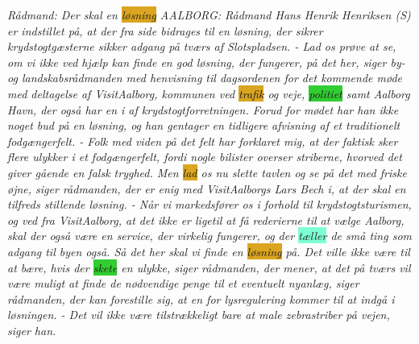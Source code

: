 \emph{
Rådmand: Der skal   en \colorbox{Goldenrod}{løsning} AALBORG: Rådmand Hans Henrik Henriksen (S) er indstillet på, at der fra  side bidrages til en løsning, der sikrer krydstogtgæsterne sikker adgang på tværs af Slotspladsen. - Lad os prøve at se, om vi ikke ved  \colorbox{Peach}{hjælp} kan \colorbox{Peach}{finde} en god løsning, der fungerer, på det her, siger by- og landskabsrådmanden med henvisning til dagsordenen for det \colorbox{Peach}{kommende} \colorbox{Peach}{møde} med deltagelse af VisitAalborg, \colorbox{Peach}{kommunen} ved \colorbox{Goldenrod}{trafik} og veje, \colorbox{LimeGreen}{politiet} \colorbox{Peach}{samt} Aalborg Havn, der også har en  i  af krydstogtforretningen. Forud for mødet har han ikke noget bud på en løsning, og han gentager en tidligere afvisning af et traditionelt fodgængerfelt. - Folk med viden på det felt har forklaret mig, at der \colorbox{Peach}{faktisk} \colorbox{Peach}{sker} flere ulykker i et fodgængerfelt, fordi nogle bilister overser striberne, hvorved det \colorbox{Peach}{giver} gående en falsk tryghed. Men \colorbox{Goldenrod}{lad} os nu slette tavlen og se på det med friske øjne, siger rådmanden, der er enig med VisitAalborgs Lars Bech i, at der skal  en tilfreds stillende løsning. - Når vi markedsfører os i \colorbox{Peach}{forhold} til krydstogtsturismen, og ved fra VisitAalborg, at det ikke er ligetil at få rederierne til at vælge Aalborg, skal der også være en service, der virkelig fungerer, og der \colorbox{Aquamarine}{tæller} de små \colorbox{Peach}{ting} som adgang til \colorbox{Peach}{byen} også. Så det her skal vi \colorbox{Peach}{finde} en \colorbox{Goldenrod}{løsning} på. Det ville ikke være til at bære, hvis der \colorbox{LimeGreen}{skete} en ulykke, siger rådmanden, der mener, at det på tværs vil være \colorbox{Peach}{muligt} at \colorbox{Peach}{finde} de nødvendige \colorbox{Peach}{penge} til et eventuelt nyanlæg, siger rådmanden, der kan forestille sig, at en  for lysregulering kommer til at indgå i løsningen. - Det vil ikke være tilstrækkeligt bare at male zebrastriber på vejen, siger han.
}